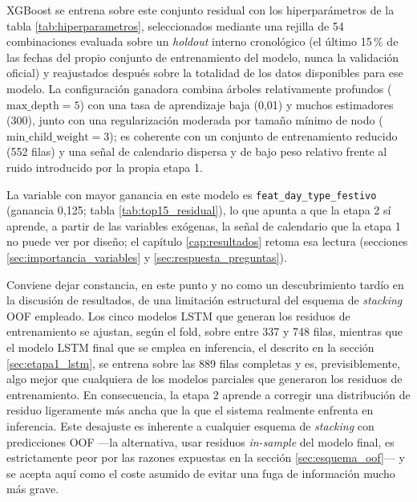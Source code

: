 XGBoost \parencite{chen2016xgboost} se entrena sobre este conjunto residual con los
hiperparámetros de la tabla \ref{tab:hiperparametros}, seleccionados mediante una rejilla
de 54 combinaciones evaluada sobre un \emph{holdout} interno cronológico (el último
15\,\% de las fechas del propio conjunto de entrenamiento del modelo, nunca la validación
oficial) y reajustados después sobre la totalidad de los datos disponibles para ese
modelo. La configuración ganadora combina árboles relativamente profundos
($\text{max\_depth}=5$) con una tasa de aprendizaje baja (0,01) y muchos estimadores
(300), junto con una regularización moderada por tamaño mínimo de nodo
($\text{min\_child\_weight}=3$); es coherente con un conjunto de entrenamiento reducido
(552 filas) y una señal de calendario dispersa y de bajo peso relativo frente al ruido
introducido por la propia etapa 1.

\begin{table}[htbp]
  \centering
  \small
  \setlength{\tabcolsep}{4pt}
  \resizebox{\textwidth}{!}{%
  }
  \caption{}
  \label{tab:hiperparametros}
\end{table}

La variable con mayor ganancia en este modelo es
\texttt{feat\_\allowbreak{}day\_\allowbreak{}type\_\allowbreak{}festivo} (ganancia 0,125;
tabla \ref{tab:top15_residual}), lo que apunta a que la etapa 2 sí aprende, a partir de
las variables exógenas, la señal de calendario que la etapa 1 no puede ver por diseño; el
capítulo \ref{cap:resultados} retoma esa lectura (secciones
\ref{sec:importancia_variables} y \ref{sec:respuesta_preguntas}).

Conviene dejar constancia, en este punto y no como un descubrimiento tardío en la
discusión de resultados, de una limitación estructural del esquema de \emph{stacking}
OOF empleado. Los cinco modelos LSTM que generan los residuos de entrenamiento se ajustan,
según el fold, sobre entre 337 y 748 filas, mientras que el modelo LSTM final que se
emplea en inferencia, el descrito en la sección \ref{sec:etapa1_lstm}, se entrena sobre
las 889 filas completas y es, previsiblemente, algo mejor que cualquiera de los modelos
parciales que generaron los residuos de entrenamiento. En consecuencia, la etapa 2 aprende
a corregir una distribución de residuo ligeramente más ancha que la que el sistema
realmente enfrenta en inferencia. Este desajuste es inherente a cualquier esquema de
\emph{stacking} con predicciones OOF —la alternativa, usar residuos \emph{in-sample} del
modelo final, es estrictamente peor por las razones expuestas en la sección
\ref{sec:esquema_oof}— y se acepta aquí como el coste asumido de evitar una fuga de
información mucho más grave.

